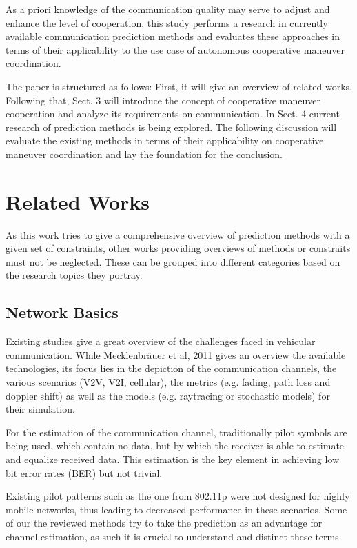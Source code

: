 \documentclass{IEEEtran}
\begin{document}
As a priori knowledge of the communication quality may serve to adjust and enhance the level of cooperation, this study performs a research in currently available communication prediction methods and evaluates these approaches in terms of their applicability to the use case of autonomous cooperative maneuver coordination.

The paper is structured as follows: First, it will give an overview of related works. Following that, Sect. 3 will introduce the concept of cooperative maneuver cooperation and analyze its requirements on communication. In Sect. 4 current research of prediction methods is being explored. The following discussion will evaluate the existing methods in terms of their applicability on cooperative maneuver coordination and lay the foundation for the conclusion.


\section[]{Related Works}
As this work tries to give a comprehensive overview of prediction methods with a given set of constraints, other works providing overviews of methods or constraits must not be neglected. These can be grouped into different categories based on the research topics they portray.
\subsection{Network Basics}
Existing studies give a great overview of the challenges faced in vehicular communication. While Mecklenbräuer et al, 2011 gives an overview the available technologies, its focus lies in the depiction of the communication channels, the various scenarios (V2V, V2I, cellular), the metrics (e.g. fading, path loss and doppler shift) as well as the models (e.g. raytracing or stochastic models) for their simulation.

For the estimation of the communication channel, traditionally pilot symbols are being used, which contain no data, but by which the receiver is able to estimate and equalize received data. This estimation is the key element in achieving low bit error rates (BER) but not trivial. 

Existing pilot patterns such as the one from 802.11p were not designed for highly mobile networks, thus leading to decreased performance in these scenarios. Some of our the reviewed methods try to take the prediction as an advantage for channel estimation, as such it is crucial to understand and distinct these terms.
\end{document}
